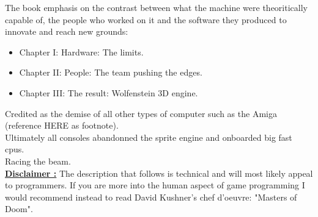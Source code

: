The book emphasis on the contrast between what the machine were theoritically capable of, the people who worked on it and the software they produced to innovate and reach new grounds:
\begin{itemize}
\item Chapter I: Hardware: The limits.
\item Chapter II: People: The team pushing the edges.
\item Chapter III: The result: Wolfenstein 3D engine.
\end{itemize}
Credited as the demise of all other types of computer such as the Amiga (reference HERE as footnote).\\
Ultimately all consoles abandonned the sprite engine and onboarded big fast cpus.\\
Racing the beam.\\
 \textbf{\underline{Disclaimer :}} The description that follows is technical and will most likely appeal to programmers. If you are more into the human aspect of game programming I would recommend instead to read David Kushner's chef d'oeuvre: "Masters of Doom".
